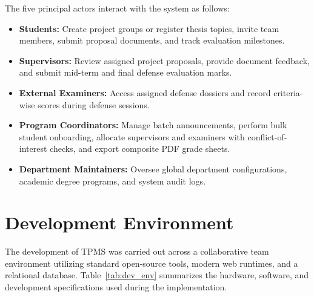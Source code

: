 \documentclass[12pt,a4paper]{report}
\begin{document}
The five principal actors interact with the system as follows:
\begin{itemize}
  \item \textbf{Students:} Create project groups or register thesis topics, invite team members, submit proposal documents, and track evaluation milestones.
  \item \textbf{Supervisors:} Review assigned project proposals, provide document feedback, and submit mid-term and final defense evaluation marks.
  \item \textbf{External Examiners:} Access assigned defense dossiers and record criteria-wise scores during defense sessions.
  \item \textbf{Program Coordinators:} Manage batch announcements, perform bulk student onboarding, allocate supervisors and examiners with conflict-of-interest checks, and export composite PDF grade sheets.
  \item \textbf{Department Maintainers:} Oversee global department configurations, academic degree programs, and system audit logs.
\end{itemize}

\section{Development Environment}
The development of TPMS was carried out across a collaborative team environment utilizing standard open-source tools, modern web runtimes, and a relational database. Table~\ref{tab:dev_env} summarizes the hardware, software, and development specifications used during the implementation.
\end{document}
